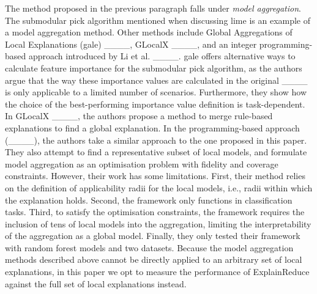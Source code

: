 The method proposed in the previous paragraph falls under \emph{model aggregation}.
The submodular pick algorithm mentioned when discussing {\sc lime} is an example of a model aggregation method.
Other methods include Global Aggregations of Local Explanations ({\sc gale}) ____, {\sc GLocalX} ____, and an integer programming-based approach introduced by Li et al. ____.
{\sc gale} offers alternative ways to calculate feature importance for the submodular pick algorithm, as the authors argue that the way these importance values are calculated in the original ____ is only applicable to a limited number of scenarios.
Furthermore, they show how the choice of the best-performing importance value definition is task-dependent.
In {\sc GLocalX} ____, the authors propose a method to merge rule-based explanations to find a global explanation.
In the programming-based approach (____), the authors take a similar approach to the one proposed in this paper.
They also attempt to find a representative subset of local models, and formulate model aggregation as an optimisation problem with fidelity and coverage constraints.
However, their work has some limitations.
First, their method relies on the definition of applicability radii for the local models, i.e., radii within which the explanation holds.
Second, the framework only functions in classification tasks.
Third, to satisfy the optimisation constraints, the framework requires the inclusion of tens of local models into the aggregation, limiting the interpretability of the aggregation as a global model.
Finally, they only tested their framework with random forest models and two datasets.
Because the model aggregation methods described above cannot be directly applied to an arbitrary set of local explanations, in this paper we opt to measure the performance of {\sc ExplainReduce} against the full set of local explanations instead.